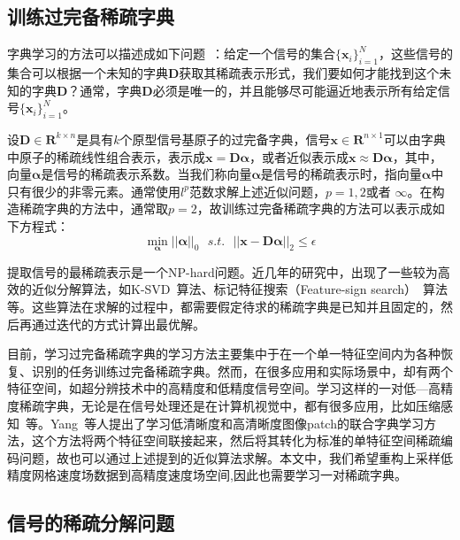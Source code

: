 \subsection{训练过完备稀疏字典}

字典学习的方法可以描述成如下问题~\cite{aharon2006overcomplete}：给定一个信号的集合$\{\boldsymbol x_i\}_{i = 1}^{N}$，这些信号的集合可以根据一个未知的字典$\boldsymbol D$获取其稀疏表示形式，我们要如何才能找到这个未知的字典$\boldsymbol D$？通常，字典$\boldsymbol D$必须是唯一的，并且能够尽可能逼近地表示所有给定信号$\{\boldsymbol x_i\}_{i = 1}^{N}$。

设${\boldsymbol D} \in {\boldsymbol R}^{k \times n}$是具有$k$个原型信号基原子的过完备字典，信号$\boldsymbol x \in \boldsymbol R^{n \times 1}$可以由字典中原子的稀疏线性组合表示，表示成$\boldsymbol x = \boldsymbol {D\alpha}$，或者近似表示成$\boldsymbol x \approx \boldsymbol {D\alpha}$，其中，向量$\boldsymbol \alpha$是信号的稀疏表示系数。当我们称向量$\boldsymbol \alpha$是信号的稀疏表示时，指向量$\boldsymbol \alpha$中只有很少的非零元素。通常使用$l^p$范数求解上述近似问题，$p = 1,2$或者 $\infty$。在构造稀疏字典的方法中，通常取$p = 2$，故训练过完备稀疏字典的方法可以表示成如下方程式：
\begin{equation}
\label{eq:sparseRep}
\min_{\boldsymbol  \alpha}||\boldsymbol \alpha||_0 \ \ \ s.t. \ \ \ ||\boldsymbol x - \boldsymbol {D\alpha}||_2 \leq \epsilon
\end{equation}

提取信号的最稀疏表示是一个NP-hard问题。近几年的研究中，出现了一些较为高效的近似分解算法，如K-SVD~\cite{aharon2006svd}算法、标记特征搜索（Feature-sign search）~\cite{lee2006efficient}算法等。这些算法在求解的过程中，都需要假定待求的稀疏字典是已知并且固定的，然后再通过迭代的方式计算出最优解。

目前，学习过完备稀疏字典的学习方法主要集中于在一个单一特征空间内为各种恢复、识别的任务训练过完备稀疏字典。然而，在很多应用和实际场景中，却有两个特征空间，如超分辨技术中的高精度和低精度信号空间。学习这样的一对低—高精度稀疏字典，无论是在信号处理还是在计算机视觉中，都有很多应用，比如压缩感知~\cite{donoho2006compressed}等。Yang~\cite{yang2012coupled}等人提出了学习低清晰度和高清晰度图像patch的联合字典学习方法，这个方法将两个特征空间联接起来，然后将其转化为标准的单特征空间稀疏编码问题，故也可以通过上述提到的近似算法求解。本文中，我们希望重构上采样低精度网格速度场数据到高精度速度场空间,因此也需要学习一对稀疏字典。

\subsection{信号的稀疏分解问题}


